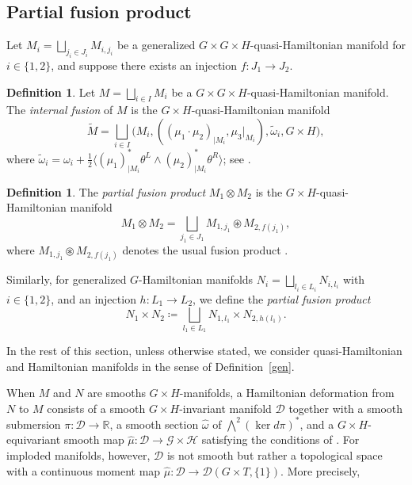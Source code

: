 \documentclass[reqno]{amsart}
\theoremstyle{plain}
\theoremstyle{definition}
\newtheorem{Def}[Thm]{Definition}
\begin{document}
\subsection{Partial fusion product}

Let $M_{i} = \bigsqcup_{j_{i}\in J_{i}} M_{i,j_{i}}$ be a generalized $G\times G\times H$-quasi-Hamiltonian manifold for $i \in \{1,2\}$, and suppose there exists an injection $f: J_{1} \to J_{2}$.

\begin{Def}
Let $M = \bigsqcup_{i\in I} M_i$ be a $G\times G\times H$-quasi-Hamiltonian manifold. The \emph{internal fusion} of $M$ is the $G\times H$-quasi-Hamiltonian manifold
\[
\widetilde{M} = \bigsqcup_{i\in I} \bigl(M_i, ((\mu_1\cdot \mu_2)_{|M_i}, \mu_3|_{M_i}), \tilde{\omega}_i, G\times H\bigr),
\]
where $\tilde{\omega}_i = \omega_i + \frac{1}{2}\langle (\mu_1)_{|M_i}^*\theta^L \wedge (\mu_2)_{|M_i}^*\theta^R \rangle$; see \cite[Section~3]{alekseev2002quasi}.
\end{Def}

\begin{Def}
The \emph{partial fusion product} $M_{1}\otimes M_{2}$ is the $G\times H$-quasi-Hamiltonian manifold
\[
M_{1}\otimes M_{2} = \bigsqcup_{j_{1}\in J_{1}} M_{1,j_{1}}\circledast M_{2,f(j_{1})},
\]
where $M_{1,j_{1}}\circledast M_{2,f(j_{1})}$ denotes the usual fusion product \cite[]{alekseev1998}.
\end{Def}

Similarly, for generalized $G$-Hamiltonian manifolds $N_{i} = \bigsqcup_{l_{i}\in L_{i}} N_{i,l_{i}}$ with $i \in \{1,2\}$, and an injection $h: L_{1} \to L_{2}$, we define the \emph{partial fusion product}
\[
N_{1}\times N_{2} \coloneqq \bigsqcup_{l_{1}\in L_{1}} N_{1,l_{1}}\times N_{2,h(l_{1})}.
\]

In the rest of this section, unless otherwise stated, we consider quasi-Hamiltonian and Hamiltonian manifolds in the sense of Definition~\ref{gen}.

When $M$ and $N$ are smooths $G\times H$-manifolds, a Hamiltonian deformation from $N$ to $M$ consists of a smooth $G\times H$-invariant manifold $\mathcal{D}$ together with a smooth submersion $\pi: \mathcal{D} \to \mathbb{R}$, a smooth section $\hat{\omega}$ of $\bigwedge^{2}(\ker d\pi)^*$, and a $G\times H$-equivariant smooth map $\hat{\mu}: \mathcal{D} \to \mathcal{G} \times \mathcal{H}$ satisfying the conditions of \cite[Theorem~2.5]{JMM2025deformations}. For imploded manifolds, however, $\mathcal{D}$ is not smooth but rather a topological space with a continuous moment map $\hat{\mu}: \mathcal{D} \to \mathcal{D}(G\times T, \{1\})$. More precisely,
\end{document}
